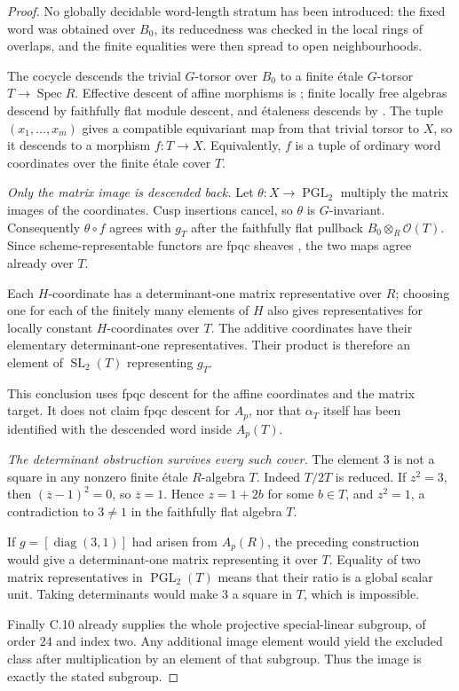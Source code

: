 \begin{proof}
No globally decidable word-length stratum has been introduced:
the fixed word was obtained over $B_0$, its reducedness was
checked in the local rings of overlaps, and the finite equalities
were then spread to open neighbourhoods.

The cocycle descends the trivial $G$-torsor over $B_0$ to a finite
\'etale $G$-torsor $T\to\operatorname{Spec}R$.
Effective descent of affine morphisms is
\citet[Lemma~35.37.1, Tag~0245]{C_Stacks_0245};
finite locally free algebras descend by faithfully flat module
descent, and \'etaleness descends by
\citet[Lemma~35.23.31, Tag~02VN]{C_Stacks_02VN}.
The tuple $(x_1,\ldots,x_m)$ gives a compatible equivariant map
from that trivial torsor to $X$, so it descends to a morphism
$f:T\to X$. Equivalently, $f$ is a tuple of ordinary word
coordinates over the finite \'etale cover $T$.

\emph{Only the matrix image is descended back.}
Let $\theta:X\to\operatorname{PGL}_2$ multiply the matrix images
of the coordinates. Cusp insertions cancel, so $\theta$ is
$G$-invariant. Consequently $\theta\circ f$ agrees with $g_T$
after the faithfully flat pullback
$B_0\otimes_R\mathcal O(T)$.
Since scheme-representable functors are fpqc sheaves
\citep[Lemma~35.13.7, Tag~023Q]{C_Stacks_023Q},
the two maps agree already over $T$.

Each $H$-coordinate has a determinant-one matrix representative
over $R$; choosing one for each of the finitely many elements of
$H$ also gives representatives for locally constant
$H$-coordinates over $T$. The additive coordinates have their
elementary determinant-one representatives. Their product is
therefore an element of $\operatorname{SL}_2(T)$ representing
$g_T$.

This conclusion uses fpqc descent for the affine coordinates and
the matrix target. It does not claim fpqc descent for $A_p$, nor
that $\alpha_T$ itself has been identified with the descended
word inside $A_p(T)$.

\emph{The determinant obstruction survives every such cover.}
The element $3$ is not a square in any nonzero finite \'etale
$R$-algebra $T$. Indeed $T/2T$ is reduced. If $z^2=3$, then
$(\overline z-1)^2=0$, so $\overline z=1$.
Hence $z=1+2b$ for some $b\in T$, and $z^2=1$, a contradiction
to $3\ne1$ in the faithfully flat algebra $T$.

If $g=[\operatorname{diag}(3,1)]$ had arisen from $A_p(R)$,
the preceding construction would give a determinant-one matrix
representing it over $T$. Equality of two matrix representatives
in $\operatorname{PGL}_2(T)$ means that their ratio is a global
scalar unit. Taking determinants would make $3$ a square in $T$,
which is impossible.

Finally C.10 already supplies the whole projective special-linear
subgroup, of order $24$ and index two. Any additional image
element would yield the excluded class after multiplication by
an element of that subgroup. Thus the image is exactly the
stated subgroup.
\end{proof}

